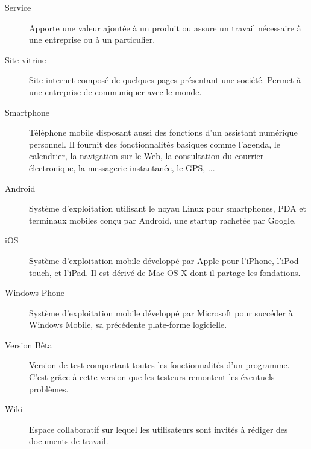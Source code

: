 \documentclass{life-fr}
\begin{document}
\begin{description}
\item[Service]
Apporte une valeur ajoutée à un produit ou assure un travail nécessaire à une entreprise ou à un particulier.

\item[Site vitrine]
Site internet composé de quelques pages présentant une société. Permet à une entreprise de communiquer avec le monde.

\item[Smartphone]
Téléphone mobile disposant aussi des fonctions d'un assistant numérique personnel. Il fournit des fonctionnalités basiques comme l'agenda, le calendrier, la navigation sur le Web, la consultation du courrier électronique, la messagerie instantanée, le GPS, ...

\item[Android]
Système d’exploitation utilisant le noyau Linux pour smartphones, PDA et terminaux mobiles conçu par Android, une startup rachetée par Google.

\item[iOS]
Système d’exploitation mobile développé par Apple pour l'iPhone, l'iPod touch, et l'iPad. Il est dérivé de Mac OS X dont il partage les fondations.

\item[Windows Phone]
Système d’exploitation mobile développé par Microsoft pour succéder à Windows Mobile, sa précédente plate-forme logicielle.

\item[Version Bêta]
Version de test comportant toutes les fonctionnalités d'un programme. C'est grâce à cette version que les testeurs remontent les éventuels problèmes.

\item[Wiki]
Espace collaboratif sur lequel les utilisateurs sont invités à rédiger des documents de travail.


\end{description}
\end{document}
